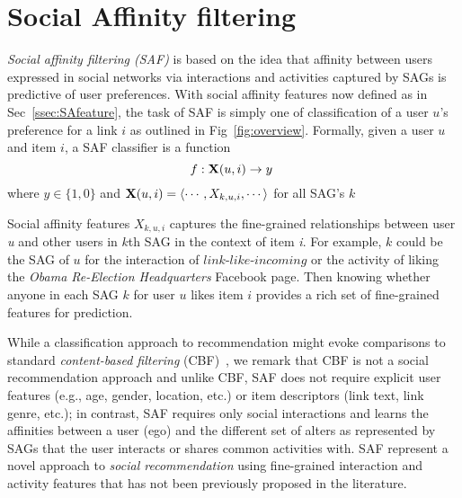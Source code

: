 
\section{Social Affinity filtering}

\emph{Social affinity filtering (SAF)} is based on the idea that
affinity between users expressed in social networks via interactions
and activities captured by SAGs is predictive of user preferences.
With social affinity features now defined as in Sec~\ref{ssec:SAfeature}, the task of SAF is
simply one of classification of a user $u$'s preference for a link $i$
as outlined in Fig~\ref{fig:overview}. 
Formally, given a user $u$ and item $i$, a SAF classifier is  a
function 
$$f: \x(u,i) \to y\ $$ where $ y \in \{1, 0\}$ and $\x(u,i) = \langle
\cdots,X_{k,u,i},\cdots \rangle$ for all SAG's $k$

Social affinity features $X_{k,u,i}$ captures the fine-grained relationships between user \textit{u}
and other users in $k$th SAG in the context of item \textit{i}.
For example, $k$ could be the SAG of $u$ for the interaction of $\textit{link-like-incoming}$ or the activity of
liking the {\em Obama Re-Election Headquarters} Facebook page.  Then knowing whether
anyone in each SAG $k$ for user $u$ likes item $i$ provides a rich set
of fine-grained features for prediction.

While a classification approach to recommendation might evoke comparisons to standard
\emph{content-based filtering} (CBF)~\cite{newsweeder}, we remark that
CBF is not a social recommendation approach and unlike CBF, SAF does
not require explicit user features (e.g., age, gender, location, etc.)
or item descriptors (link text, link genre, etc.); in contrast, SAF
requires only social interactions and learns the affinities between a
user (ego) and the different set of alters as represented by SAGs that
the user interacts or shares common activities with. SAF represent a novel 
approach to \emph{social recommendation} using fine-grained interaction and
activity features that has not been previously proposed in the literature.
 


